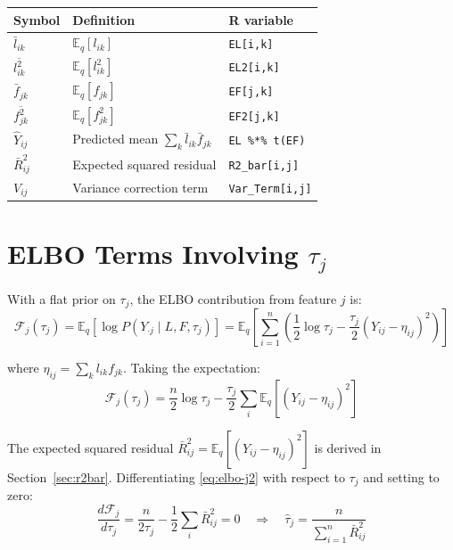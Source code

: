 \documentclass[11pt]{article}
\newcommand{\lbar}[2]{\bar{l}_{#1#2}}
\newcommand{\fbar}[2]{\bar{f}_{#1#2}}
\newcommand{\lsec}[2]{\overline{l^2_{#1#2}}}
\newcommand{\fsec}[2]{\overline{f^2_{#1#2}}}
\begin{document}
\begin{center}
\begin{tabular}{lll}
\toprule
\textbf{Symbol} & \textbf{Definition} & \textbf{R variable} \\
\midrule
$\lbar{i}{k}$ & $\mathbb{E}_q[l_{ik}]$ & \texttt{EL[i,k]} \\
$\lsec{i}{k}$ & $\mathbb{E}_q[l_{ik}^2]$ & \texttt{EL2[i,k]} \\
$\fbar{j}{k}$ & $\mathbb{E}_q[f_{jk}]$ & \texttt{EF[j,k]} \\
$\fsec{j}{k}$ & $\mathbb{E}_q[f_{jk}^2]$ & \texttt{EF2[j,k]} \\
$\hat{Y}_{ij}$ & Predicted mean $\sum_k\lbar{i}{k}\fbar{j}{k}$ & \texttt{EL \%*\% t(EF)} \\
$\bar{R}^2_{ij}$ & Expected squared residual & \texttt{R2\_bar[i,j]} \\
$V_{ij}$ & Variance correction term & \texttt{Var\_Term[i,j]} \\
\bottomrule
\end{tabular}
\end{center}

\section{ELBO Terms Involving $\tau_j$}\label{sec:elbo}

With a flat prior on $\tau_j$, the ELBO contribution from feature $j$ is:
\begin{equation}
  \mathcal{F}_j(\tau_j) =
  \mathbb{E}_q\!\left[\log P(Y_{\cdot j} \mid L, F, \tau_j)\right]
  = \mathbb{E}_q\!\left[\sum_{i=1}^n \left(\frac{1}{2}\log\tau_j
    - \frac{\tau_j}{2}(Y_{ij} - \eta_{ij})^2\right)\right]
  \label{eq:elbo-j}
\end{equation}

where $\eta_{ij} = \sum_k l_{ik}f_{jk}$.  Taking the expectation:
\begin{equation}
  \mathcal{F}_j(\tau_j) = \frac{n}{2}\log\tau_j
  - \frac{\tau_j}{2}\sum_i\mathbb{E}_q\!\left[(Y_{ij} - \eta_{ij})^2\right]
  \label{eq:elbo-j2}
\end{equation}

The expected squared residual $\bar{R}^2_{ij} = \mathbb{E}_q[(Y_{ij}-\eta_{ij})^2]$
is derived in Section~\ref{sec:r2bar}.  Differentiating \eqref{eq:elbo-j2}
with respect to $\tau_j$ and setting to zero:
\begin{equation}
  \frac{d\mathcal{F}_j}{d\tau_j} = \frac{n}{2\tau_j}
  - \frac{1}{2}\sum_i\bar{R}^2_{ij} = 0
  \quad\Rightarrow\quad
  \boxed{\hat{\tau}_j = \frac{n}{\displaystyle\sum_{i=1}^n \bar{R}^2_{ij}}}
  \label{eq:tau-mle}
\end{equation}
\end{document}
